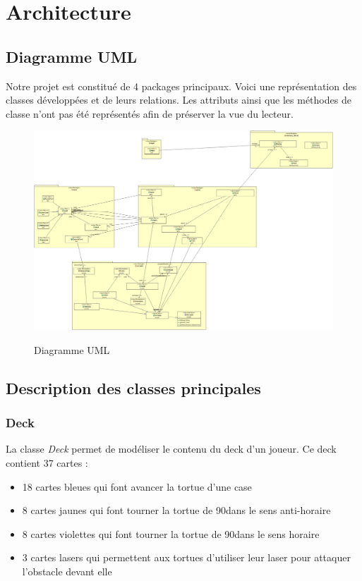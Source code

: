 \documentclass{article}
\begin{document}
\section{Architecture}
	\subsection{Diagramme UML}
\indent Notre projet est constitué de 4 packages principaux. Voici une représentation des classes développées et de leurs relations. Les attributs ainsi que les méthodes de classe n'ont pas été représentés afin de préserver la vue du lecteur.

		\begin{figure}[h]
			\begin{center}
				\includegraphics[scale=0.21]{../UML/diagramme_UML} \\
			\end{center}
			\caption{Diagramme UML}
		\end{figure}  
	
	\subsection{Description des classes principales}
		\subsubsection{Deck}
		La classe \textit{Deck} permet de modéliser le contenu du deck d'un joueur. Ce deck contient 37 cartes : 
			\begin{itemize}
  				\item 18 cartes bleues qui font avancer la tortue d'une case
  				\item 8 cartes jaunes qui font tourner la tortue de 90\degree dans le sens anti-horaire
				\item 8 cartes violettes qui font tourner la tortue de 90\degree dans le sens horaire
				\item 3 cartes lasers qui permettent aux tortues d'utiliser leur laser pour attaquer l'obstacle devant elle
			\end{itemize}
\end{document}
